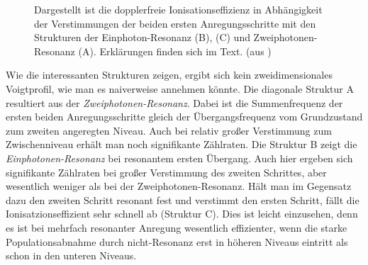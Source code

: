 \begin{figure}[h]
	\centering
	\caption[2D-Laserscan]{Dargestellt ist die dopplerfreie
	Ionisationseffizienz in Abhängigkeit
	der Verstimmungen der beiden ersten
	Anregungsschritte mit den Strukturen
	der Einphoton-Resonanz (B), (C) und
	Zweiphotonen-Resonanz (A).
	Erklärungen finden sich im Text. (aus
	\cite{schumann:2005:dissertation})}\label{fig:2D-laserscan_theorie_schumann}
\end{figure}
Wie die interessanten Strukturen zeigen, ergibt sich kein zweidimensionales
Voigtprofil, wie man es naiverweise annehmen könnte. Die diagonale Struktur A
resultiert aus der \textit{Zweiphotonen-Resonanz}. Dabei ist die Summenfrequenz
der ersten beiden Anregungsschritte gleich der Übergangsfrequenz vom
Grundzustand zum zweiten angeregten Niveau. Auch bei relativ großer Verstimmung
zum Zwischenniveau erhält man noch signifikante Zählraten. Die Struktur B
zeigt die \textit{Einphotonen-Resonanz} bei resonantem ersten Übergang. Auch
hier ergeben sich signifikante Zählraten bei großer Verstimmung des zweiten Schrittes, aber
wesentlich weniger als bei der Zweiphotonen-Resonanz. Hält man im Gegensatz dazu
den zweiten Schritt resonant fest und verstimmt den ersten Schritt, fällt die
Ionisatzionseffizient sehr schnell ab (Struktur C). Dies ist leicht einzusehen,
denn es ist bei mehrfach resonanter Anregung wesentlich effizienter, wenn die starke
Populationsabnahme durch nicht-Resonanz erst in höheren Niveaus eintritt als
schon in den unteren Niveaus.

